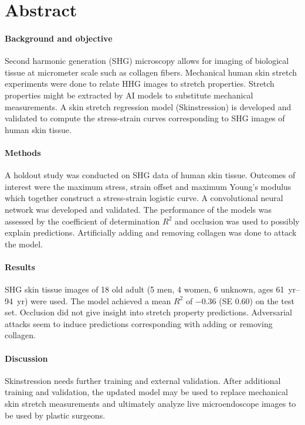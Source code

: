 \section*{Abstract}

\paragraph{Background and objective}
Second harmonic generation (SHG) microscopy allows for imaging of biological tissue at micrometer scale such as collagen fibers.
Mechanical human skin stretch experiments were done to relate HHG images to stretch properties.
Stretch properties might be extracted by AI models to substitute mechanical measurements.
A skin stretch regression model (Skinstression) is developed and validated to compute the stress-strain curves corresponding to SHG images of human skin tissue.

\paragraph{Methods}
A holdout study was conducted on SHG data of human skin tissue.
Outcomes of interest were the maximum stress, strain offset and maximum Young's modulus which together construct a stress-strain logistic curve.
A convolutional neural network was developed and validated.
The performance of the models was assessed by the coefficient of determination $R^2$ and occlusion was used to possibly explain predictions.
Artificially adding and removing collagen was done to attack the model.

\paragraph{Results}
SHG skin tissue images of 18 old adult (5 men, 4 women, 6 unknown, ages \qtyrange{61}{94}{yr}) were used.
The model achieved a mean $R^2$ of \num{-0.36} (SE \num{0.60}) on the test set.
Occlusion did not give insight into stretch property predictions.
Adversarial attacks seem to induce predictions corresponding with adding or removing collagen.

\paragraph{Discussion}
Skinstression needs further training and external validation.
After additional training and validation, the updated model may be used to replace mechanical skin stretch measurements and ultimately analyze live microendoscope images to be used by plastic surgeons.
